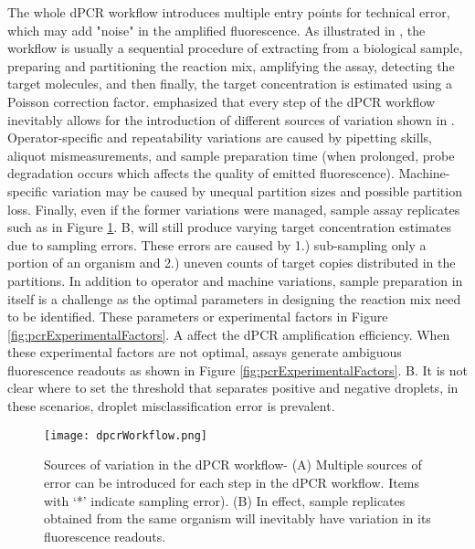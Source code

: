 The whole dPCR workflow introduces multiple entry points for technical error, which may add "noise" in the amplified fluorescence. As illustrated in , the workflow is usually a sequential procedure of extracting from a biological sample, preparing and partitioning the reaction mix, amplifying the assay, detecting the target molecules, and then finally, the target concentration is estimated using a Poisson correction factor.  emphasized that every step of the dPCR workflow inevitably allows for the introduction of different sources of variation shown in . Operator-specific and repeatability variations are caused by pipetting skills, aliquot mismeasurements, and sample preparation time (when prolonged, probe degradation occurs which affects the quality of emitted fluorescence). Machine-specific variation may be caused by unequal partition sizes and possible partition loss. Finally, even if the former variations were managed, sample assay replicates such as in Figure \ref{fig:dpcrWorkflow}. B, will still produce varying target concentration estimates due to sampling errors. These errors are caused by 1.) sub-sampling only a portion of an organism and 2.) uneven counts of target copies distributed in the partitions. In addition to operator and machine variations, sample preparation in itself is a challenge as the optimal parameters in designing the reaction mix need to be identified. These parameters or experimental factors in Figure \ref{fig:pcrExperimentalFactors}. A affect the dPCR amplification efficiency. When these experimental factors are not optimal, assays generate ambiguous fluorescence readouts as shown in Figure \ref{fig:pcrExperimentalFactors}. B. It is not clear where to set the threshold that separates positive and negative droplets, in these scenarios, droplet misclassification error is prevalent.

\begin{figure}[h]
    \centering
    \texttt{[image: dpcrWorkflow.png]}
    \caption[Sources of variation in the dPCR workflow]%
    {Sources of variation in the dPCR workflow- (A) Multiple sources of error can be introduced for each step in the dPCR workflow. Items with `*' indicate sampling error). (B) In effect, sample replicates obtained from the same organism will inevitably have variation in its fluorescence readouts. }
        \label{fig:dpcrWorkflow}
\end{figure}

